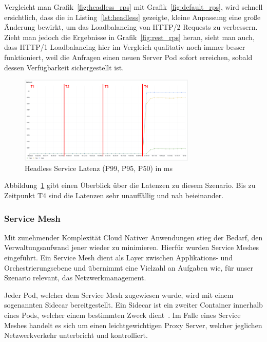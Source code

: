 Vergleicht man Grafik~\ref{fig:headless_rps} mit Grafik~\ref{fig:default_rps}, wird schnell ersichtlich, dass die in Listing~\ref{lst:headless} gezeigte, kleine Anpassung eine große Änderung bewirkt, um das Loadbalancing von HTTP/2 Requests zu verbessern.
Zieht man jedoch die Ergebnisse in Grafik~\ref{fig:rest_rps} heran, sieht man auch, dass HTTP/1 Loadbalancing hier im Vergleich qualitativ noch immer besser funktioniert, weil die Anfragen einen neuen Server Pod sofort erreichen, sobald dessen Verfügbarkeit sichergestellt ist.

\begin{figure}[H]
    \centering
    \includegraphics[width=0.75\textwidth]{img/headless_latenz}
    \caption{Headless Service Latenz (P99, P95, P50) in ms}
    \label{fig:headless_latenz}
\end{figure}

Abbildung~\ref{fig:headless_latenz} gibt einen Überblick über die Latenzen zu diesem Szenario.
Bis zu Zeitpunkt T4 sind die Latenzen sehr unauffällig und nah beieinander.

\subsubsection{Service Mesh}\label{subsubsec:mesh}

Mit zunehmender Komplexität Cloud Nativer Anwendungen stieg der Bedarf, den Verwaltungsaufwand jener wieder zu minimieren.
Hierfür wurden Service Meshes eingeführt.
Ein Service Mesh dient als Layer zwischen Applikations- und Orchestrierungsebene und übernimmt eine Vielzahl an Aufgaben wie, für unser Szenario relevant, das Netzwerkmanagement.

Jeder Pod, welcher dem Service Mesh zugewiesen wurde, wird mit einem sogenannten Sidecar bereitgestellt.
Ein Sidecar ist ein zweiter Container innerhalb eines Pods, welcher einem bestimmten Zweck dient~\cite{koschel2021look}.
Im Falle eines Service Meshes handelt es sich um einen leichtgewichtigen Proxy Server, welcher jeglichen Netzwerkverkehr unterbricht und kontrolliert.

